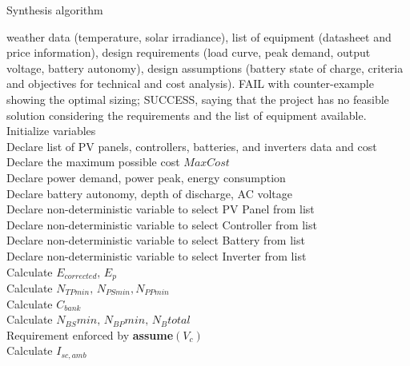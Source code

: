 \documentclass[runningheads]{llncs}
\begin{document}
 \begin{algorithm}
 \caption{Synthesis algorithm}
 \begin{algorithmic}[1]
 \begin{scriptsize}
 \renewcommand{\algorithmicrequire}{\textbf{Input:}}
 \renewcommand{\algorithmicensure}{\textbf{Output:}}
   \REQUIRE weather data (temperature, solar irradiance), list of equipment (datasheet and price information), design requirements (load curve, peak demand, output voltage, battery autonomy), design assumptions (battery state of charge, criteria and objectives for technical and cost analysis).
 \ENSURE FAIL with counter-example showing the optimal sizing; SUCCESS, saying that the project has no feasible solution considering the requirements and the list of equipment available.
  \STATE Initialize variables \\
  \STATE Declare list of PV panels, controllers, batteries, and inverters data and cost \\
  \STATE Declare the maximum possible cost $MaxCost$  \\
  \STATE Declare power demand, power peak, energy consumption \\
  \STATE Declare battery autonomy, depth of discharge, AC voltage \\
 	\STATE Declare non-deterministic variable to select PV Panel from list \\
 	\STATE Declare non-deterministic variable to select Controller from list \\
 	\STATE Declare non-deterministic variable to select Battery from list \\
 	\STATE Declare non-deterministic variable to select Inverter from list \\ 	
 	\STATE Calculate $E_{corrected}, \, E_{p} $ \\
	\STATE Calculate $N_{TPmin}, \, N_{PSmin}, N_{PPmin} $ \\
 	\STATE Calculate $C_{bank}$ \\
	\STATE Calculate $N_{BS}min, \, N_{BP}min, \, N_{B}total$ \\
	\STATE Requirement enforced by \textbf{assume}$(V_{c})$ \\
 	\STATE Calculate $I_{sc,amb}$ \\

\end{scriptsize}
\end{algorithmic}
\end{algorithm}
\end{document}
